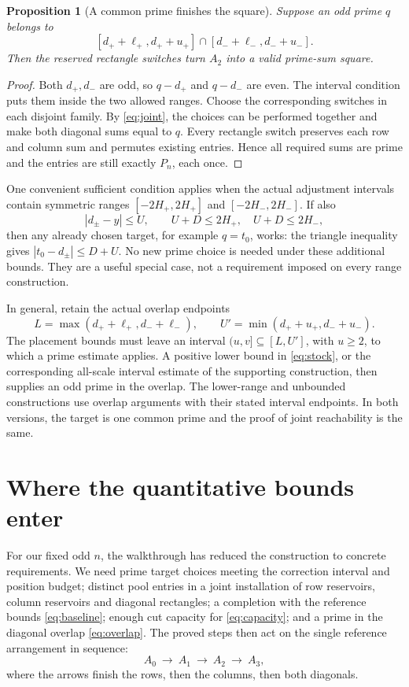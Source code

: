 \documentclass[11pt]{article}
\newtheorem{proposition}[theorem]{Proposition}
\theoremstyle{definition}
\begin{document}
\begin{proposition}[A common prime finishes the square]\label{prop:diagonal}
Suppose an odd prime \(q\) belongs to
\begin{equation}\label{eq:overlap}
 [d_++\ell_+,d_++u_+]\cap[d_-+\ell_-,d_-+u_-].
\end{equation}
Then the reserved rectangle switches turn \(A_2\) into a valid prime-sum square.
\end{proposition}
\begin{proof}
Both \(d_+,d_-\) are odd, so \(q-d_+\) and \(q-d_-\) are even. The interval
condition puts them inside the two allowed ranges. Choose the corresponding
switches in each disjoint family. By \eqref{eq:joint}, the choices can be
performed together and make both diagonal sums equal to \(q\). Every
rectangle switch preserves each row and column sum and permutes existing
entries. Hence all required sums are prime and the entries are still exactly
\(P_n\), each once.
\end{proof}

One convenient sufficient condition applies when the actual adjustment
intervals contain symmetric ranges \([-2H_+,2H_+]\) and \([-2H_-,2H_-]\).
If also
\[
 |d_\pm-y|\le U,\qquad U+D\le2H_+,\quad U+D\le2H_-,
\]
then any already chosen target, for example \(q=t_0\), works: the triangle
inequality gives \(|t_0-d_\pm|\le D+U\). No new prime choice is needed under
these additional bounds. They are a useful special case, not a requirement
imposed on every range construction.

In general, retain the actual overlap endpoints
\[
 L=\max(d_++\ell_+,d_-+\ell_-),\qquad
 U'=\min(d_++u_+,d_-+u_-).
\]
The placement bounds must leave an interval \((u,v]\subseteq[L,U']\), with
\(u\ge2\), to which a prime estimate applies. A positive lower bound in
\eqref{eq:stock}, or the corresponding all-scale interval estimate of the
supporting construction, then supplies an odd prime in the overlap. The
lower-range and unbounded constructions use overlap arguments with their
stated interval endpoints. In both versions,
the target is one common prime and the proof of joint reachability is the same.

\section{Where the quantitative bounds enter}\label{sec:ranges}

For our fixed odd \(n\), the walkthrough has reduced the construction to
concrete requirements. We need prime target choices meeting the correction
interval and position budget; distinct pool entries in a joint installation
of row reservoirs, column reservoirs and diagonal rectangles; a completion
with the reference bounds \eqref{eq:baseline}; enough cut capacity for
\eqref{eq:capacity}; and a prime in the diagonal overlap \eqref{eq:overlap}.
The proved steps then act on the single reference arrangement in sequence:
\[
 A_0\ \longrightarrow\ A_1\ \longrightarrow\ A_2\ \longrightarrow\ A_3,
\]
where the arrows finish the rows, then the columns, then both diagonals.
\end{document}
